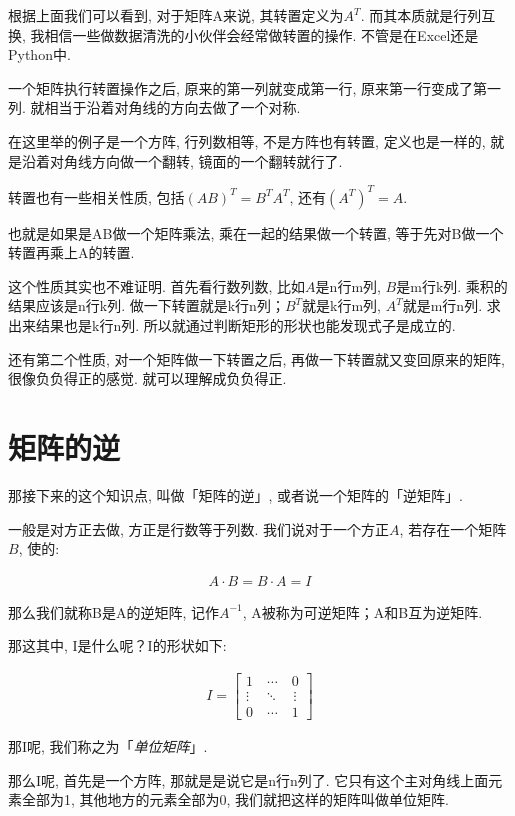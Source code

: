 根据上面我们可以看到, 对于矩阵A来说, 其转置定义为\(A^T\). 而其本质就是行列互换, 我相信一些做数据清洗的小伙伴会经常做转置的操作. 不管是在Excel还是Python中. 

一个矩阵执行转置操作之后, 原来的第一列就变成第一行, 原来第一行变成了第一列. 就相当于沿着对角线的方向去做了一个对称. 

在这里举的例子是一个方阵, 行列数相等, 不是方阵也有转置, 定义也是一样的, 就是沿着对角线方向做一个翻转, 镜面的一个翻转就行了. 

转置也有一些相关性质, 包括$(AB)^T = B^TA^T$, 还有$(A^T)^T = A$. 

也就是如果是AB做一个矩阵乘法, 乘在一起的结果做一个转置, 等于先对B做一个转置再乘上A的转置. 

这个性质其实也不难证明. 首先看行数列数, 比如$A$是n行m列, $B$是m行k列. 乘积的结果应该是n行k列. 做一下转置就是k行n列；$B^T$就是k行m列, $A^T$就是m行n列. 求出来结果也是k行n列. 所以就通过判断矩形的形状也能发现式子是成立的. 

还有第二个性质, 对一个矩阵做一下转置之后, 再做一下转置就又变回原来的矩阵, 很像负负得正的感觉. 就可以理解成负负得正. 

\section{矩阵的逆}

那接下来的这个知识点, 叫做「矩阵的逆」, 或者说一个矩阵的「逆矩阵」. 

一般是对方正去做, 方正是行数等于列数. 我们说对于一个方正$A$, 若存在一个矩阵$B$, 使的:

\begin{align*}
  A \cdot B = B \cdot A = I
\end{align*}

那么我们就称B是A的逆矩阵, 记作$A^{-1}$,  A被称为可逆矩阵；A和B互为逆矩阵. 

那这其中, I是什么呢？I的形状如下: 

\begin{align*}
I = \begin{bmatrix} 1 \quad \cdots \quad 0 \\ \vdots \quad \ddots \quad \vdots \\ 0 \quad \cdots \quad 1 \end{bmatrix}
\end{align*}

那I呢, 我们称之为「\textit{单位矩阵}」. 

那么I呢, 首先是一个方阵, 那就是是说它是n行n列了. 它只有这个主对角线上面元素全部为1, 其他地方的元素全部为0, 我们就把这样的矩阵叫做单位矩阵. 

